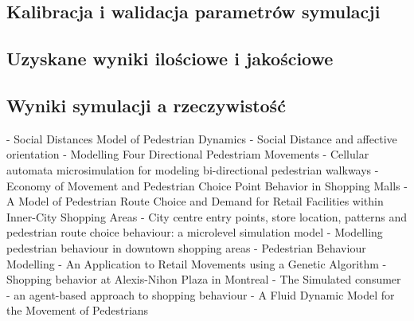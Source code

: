 \documentclass[a4paper, 12pt]{article}
\begin{document}
        \subsection{Kalibracja i walidacja parametrów symulacji}
        \label{sec:p}


        \subsection{Uzyskane wyniki ilościowe i jakościowe}
        \label{sec:results}


        \subsection{Wyniki symulacji a rzeczywistość}
        \label{sec:sim-vs-reality}


\newpage
    \begin{thebibliography}{9}
        \label{sec:refs}

         - Social Distances Model of Pedestrian Dynamics
         - Social Distance and affective orientation
         - Modelling Four Directional Pedestriam Movements
         - Cellular automata microsimulation for modeling bi-directional pedestrian walkways
         - Economy of Movement and Pedestrian Choice Point Behavior in Shopping Malls
         - A Model of Pedestrian Route Choice and Demand for Retail Facilities within Inner-City Shopping Areas
         - City centre entry points, store location, patterns and pedestrian route choice behaviour: a microlevel simulation model
         - Modelling pedestrian behaviour in downtown shopping areas
         - Pedestrian Behaviour Modelling - An Application to Retail Movements using a Genetic Algorithm
         - Shopping behavior at Alexis-Nihon Plaza in Montreal
         - The Simulated consumer - an agent-based approach to shopping behaviour
         - A Fluid Dynamic Model for the Movement of Pedestrians
    \end{thebibliography}
\end{document}
